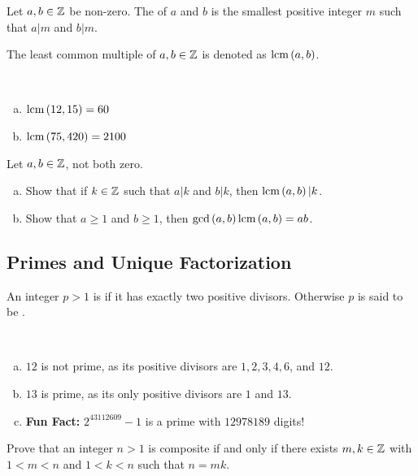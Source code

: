 \documentclass[11pt,fleqn,dvipsnames,usenames]{article}
\begin{document}
\begin{definition}
Let $a,b\in\mathbb{Z}$ be non-zero.  The  of $a$ and $b$ is the smallest positive integer $m$ such that $a|m$ and $b|m$.
\end{definition}
\vsmsp

\notation The least common multiple of $a,b\in\mathbb{Z}$ is denoted as $\text{lcm}\left(a,b\right)$.
\vsp

\begin{examples}~
\begin{enumerate}[(a)]
\item $\text{lcm}\left(12, 15\right) = 60$
\item $\text{lcm}\left(75, 420\right) = 2100$ 
\end{enumerate}
\end{examples}
\vsp

\exercises Let $a,b\in\mathbb{Z}$, not both zero.
\begin{enumerate}[(a)]
\item Show that if $k\in\mathbb{Z}$ such that $a|k$ and $b|k$, then $\text{lcm}\left(a, b\right)|k$.
\item Show that $a\geq 1$ and $b\geq 1$, then $\text{gcd}\left(a, b\right)\text{lcm}\left(a, b\right) = ab$.
\end{enumerate}
\vsp

\subsection{Primes and Unique Factorization}

\begin{definition}
An integer $p > 1$ is  if it has exactly two positive divisors.  Otherwise $p$ is said to be .
\end{definition}
\vsmsp

\begin{examples}~
\begin{enumerate}[(a)]
\item $12$ is not prime, as its positive divisors are $1, 2, 3, 4, 6$, and $12$.
\item $13$ is prime, as its only positive divisors are $1$ and $13$.
\item \textbf{Fun Fact:} $2^{43112609} - 1$ is a prime with $12978189$ digits!
\end{enumerate}
\end{examples}
\vsp

\begin{exercise}
Prove that an integer $n>1$ is composite if and only if there exists $m,k\in\mathbb{Z}$ with $1 < m < n$ and $1 < k < n$ such that $n = mk$.
\end{exercise}
\vsp
\end{document}
